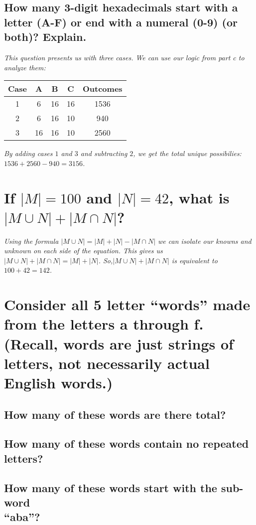 \documentclass{article}
\begin{document}
\subsection{How many 3-digit hexadecimals start with a letter (A-F) or end with a numeral (0-9) (or both)? Explain.}
\hspace{1cm}\textit{This question presents us with three cases. We can use our logic from part c to
 analyze them:}
\begin{center}
    \begin{tabular}{c|c|c|c|c}
        Case & A & B & C & Outcomes \\
        \hline
        1 & 6 & 16 & 16 & 1536 \\
        \hline
        2 & 6 & 16 & 10 & 940 \\
        \hline
        3 & 16 & 16 & 10 & 2560 \\
        \hline
    \end{tabular}
\end{center}
\hspace{1cm}\textit{By adding cases $1$ and $3$ and subtracting $2$, we get the total unique
 possibilies: $1536+2560-940 = 3156$.}

\section{If $|M| = 100$ and $|N| = 42$, what is $|M\cup N|+|M\cap N|$?}
\hspace{1cm}\textit{Using the formula $|M\cup N|=|M|+|N|-|M\cap N|$ we can isolate our knowns and unknown
 on each side of the equation. This gives us $|M\cup N|+|M\cap N| = |M|+|N|$. So,$|M\cup N|+|M\cap N|$
 is equivalent to $100+42 = 142$.}
\clearpage

\section{Consider all 5 letter “words” made from the letters a through f.
 (Recall, words are just strings of letters, not necessarily actual English words.)}
\subsection{How many of these words are there total?}
\subsection{How many of these words contain no repeated letters?}
\subsection{How many of these words start with the sub-word \\ “aba”?}
\end{document}

